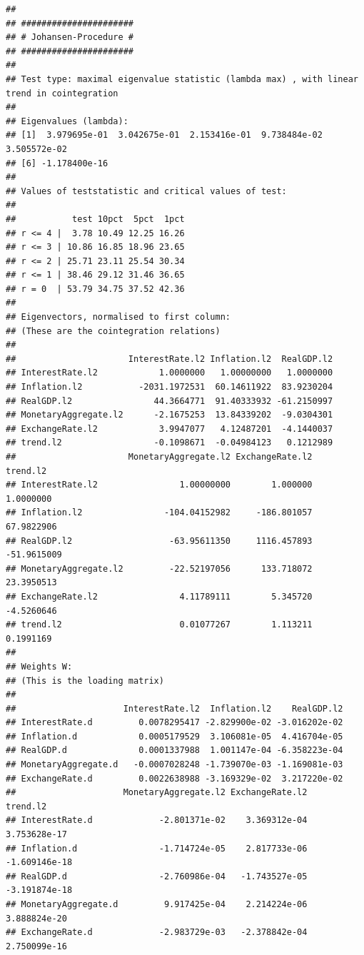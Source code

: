 \documentclass[11pt,preprint, authoryear]{elsarticle}
\numberwithin{equation}{section}
\numberwithin{figure}{section}
\numberwithin{table}{section}
\begin{document}
\begin{verbatim}
## 
## ###################### 
## # Johansen-Procedure # 
## ###################### 
## 
## Test type: maximal eigenvalue statistic (lambda max) , with linear trend in cointegration 
## 
## Eigenvalues (lambda):
## [1]  3.979695e-01  3.042675e-01  2.153416e-01  9.738484e-02  3.505572e-02
## [6] -1.178400e-16
## 
## Values of teststatistic and critical values of test:
## 
##           test 10pct  5pct  1pct
## r <= 4 |  3.78 10.49 12.25 16.26
## r <= 3 | 10.86 16.85 18.96 23.65
## r <= 2 | 25.71 23.11 25.54 30.34
## r <= 1 | 38.46 29.12 31.46 36.65
## r = 0  | 53.79 34.75 37.52 42.36
## 
## Eigenvectors, normalised to first column:
## (These are the cointegration relations)
## 
##                      InterestRate.l2 Inflation.l2  RealGDP.l2
## InterestRate.l2            1.0000000   1.00000000   1.0000000
## Inflation.l2           -2031.1972531  60.14611922  83.9230204
## RealGDP.l2                44.3664771  91.40333932 -61.2150997
## MonetaryAggregate.l2      -2.1675253  13.84339202  -9.0304301
## ExchangeRate.l2            3.9947077   4.12487201  -4.1440037
## trend.l2                  -0.1098671  -0.04984123   0.1212989
##                      MonetaryAggregate.l2 ExchangeRate.l2    trend.l2
## InterestRate.l2                1.00000000        1.000000   1.0000000
## Inflation.l2                -104.04152982     -186.801057  67.9822906
## RealGDP.l2                   -63.95611350     1116.457893 -51.9615009
## MonetaryAggregate.l2         -22.52197056      133.718072  23.3950513
## ExchangeRate.l2                4.11789111        5.345720  -4.5260646
## trend.l2                       0.01077267        1.113211   0.1991169
## 
## Weights W:
## (This is the loading matrix)
## 
##                     InterestRate.l2  Inflation.l2    RealGDP.l2
## InterestRate.d         0.0078295417 -2.829900e-02 -3.016202e-02
## Inflation.d            0.0005179529  3.106081e-05  4.416704e-05
## RealGDP.d              0.0001337988  1.001147e-04 -6.358223e-04
## MonetaryAggregate.d   -0.0007028248 -1.739070e-03 -1.169081e-03
## ExchangeRate.d         0.0022638988 -3.169329e-02  3.217220e-02
##                     MonetaryAggregate.l2 ExchangeRate.l2      trend.l2
## InterestRate.d             -2.801371e-02    3.369312e-04  3.753628e-17
## Inflation.d                -1.714724e-05    2.817733e-06 -1.609146e-18
## RealGDP.d                  -2.760986e-04   -1.743527e-05 -3.191874e-18
## MonetaryAggregate.d         9.917425e-04    2.214224e-06  3.888824e-20
## ExchangeRate.d             -2.983729e-03   -2.378842e-04  2.750099e-16
\end{verbatim}
\end{document}
